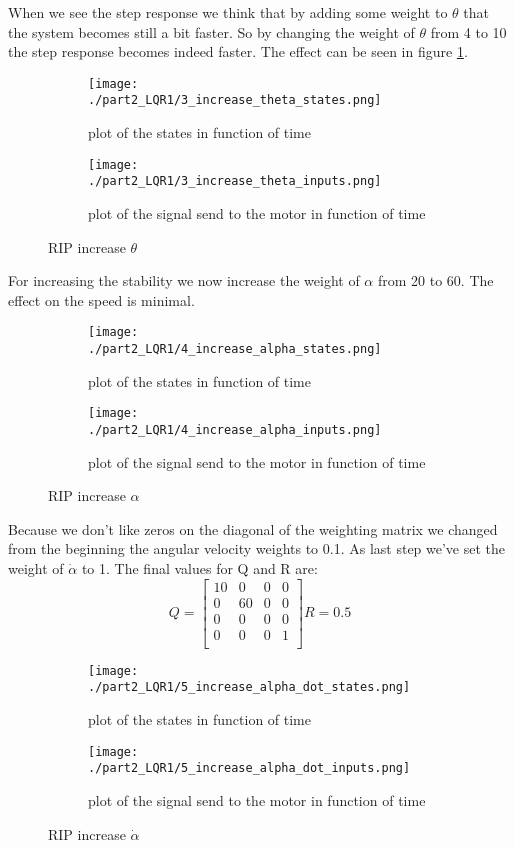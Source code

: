 When we see the step response we think that by adding some weight to $\theta$ that the system becomes still a bit faster. So by changing the weight of $\theta$ from 4 to 10 the step response becomes indeed faster. The effect can be seen in figure \ref{fig:heighT}.

\begin{figure}[H]
	\centering
	\begin{subfigure}[b]{0.45\textwidth}
		\texttt{[image: ./part2\_LQR1/3\_increase\_theta\_states.png]}
		\caption{plot of the states in function of time}
	\end{subfigure}
	\begin{subfigure}[b]{0.45\textwidth}
		\texttt{[image: ./part2\_LQR1/3\_increase\_theta\_inputs.png]}
		\caption{plot of the signal send to the motor in function of time}
	\end{subfigure}
	\caption{RIP increase $\theta$}
	\label{fig:heighT}
\end{figure}

For increasing the stability we now increase the weight of $\alpha$ from 20 to 60. The effect on the speed is minimal.

\begin{figure}[H]
	\centering
	\begin{subfigure}[b]{0.45\textwidth}
		\texttt{[image: ./part2\_LQR1/4\_increase\_alpha\_states.png]}
		\caption{plot of the states in function of time}
	\end{subfigure}
	\begin{subfigure}[b]{0.45\textwidth}
		\texttt{[image: ./part2\_LQR1/4\_increase\_alpha\_inputs.png]}
		\caption{plot of the signal send to the motor in function of time}
	\end{subfigure}
	\caption{RIP increase $\alpha$}
\end{figure}

Because we don't like zeros on the diagonal of the weighting matrix we changed from the beginning the angular velocity weights to 0.1. As last step we've set the weight of $\dot{\alpha}$ to 1. The final values for Q and R are:
$$
Q=\begin{bmatrix}
10 & 0 & 0 & 0 \\
0 & 60 & 0 & 0 \\
0 & 0 & 0 & 0 \\
0 & 0 & 0 & 1 \\
\end{bmatrix}
R=0.5
$$

\begin{figure}[H]
	\centering
	\begin{subfigure}[b]{0.45\textwidth}
		\texttt{[image: ./part2\_LQR1/5\_increase\_alpha\_dot\_states.png]}
		\caption{plot of the states in function of time}
	\end{subfigure}
	\begin{subfigure}[b]{0.45\textwidth}
		\texttt{[image: ./part2\_LQR1/5\_increase\_alpha\_dot\_inputs.png]}
		\caption{plot of the signal send to the motor in function of time}
	\end{subfigure}
	\caption{RIP increase $\dot{\alpha}$}
\end{figure}

